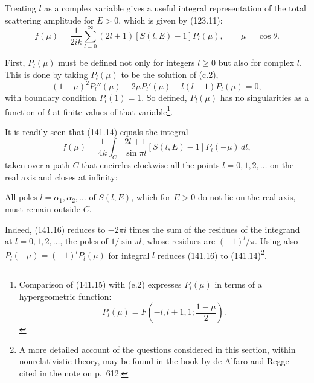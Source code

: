 Treating $l$ as a complex variable gives a useful integral representation of
the total scattering amplitude for $E>0$, which is given by (123.11):
\begin{equation}
 f(\mu)=\frac1{2ik}\sum_{l=0}^{\infty}(2l+1)[S(l,E)-1]P_l(\mu),\qquad\mu=\cos\theta.
 \tag{141.14}
\end{equation}

First, $P_l(\mu)$ must be defined not only for integers $l\ge0$ but also for
complex $l$. This is done by taking $P_l(\mu)$ to be the solution of (c.2),
\begin{equation}
 (1-\mu)^2P_l''(\mu)-2\mu P_l'(\mu)+l(l+1)P_l(\mu)=0,
 \tag{141.15}
\end{equation}
with boundary condition $P_l(1)=1$. So defined, $P_l(\mu)$ has no
singularities as a function of $l$ at finite values of that
variable\footnote{Comparison of (141.15) with (e.2) expresses $P_l(\mu)$ in
terms of a hypergeometric function:
\[
 P_l(\mu)=F\left(-l,l+1,1;\frac{1-\mu}{2}\right).
\]}.

It is readily seen that (141.14) equals the integral
\begin{equation}
 f(\mu)=\frac1{4k}\int_C\frac{2l+1}{\sin\pi l}[S(l,E)-1]P_l(-\mu)\,dl,
 \tag{141.16}
\end{equation}
taken over a path $C$ that encircles clockwise all the points
$l=0,1,2,\ldots$ on the real axis and closes at infinity:

\begin{center}
\end{center}

All poles $l=\alpha_1,\alpha_2,\ldots$ of $S(l,E)$, which for $E>0$ do not
lie on the real axis, must remain outside $C$.

Indeed, (141.16) reduces to $-2\pi i$ times the sum of the residues of the
integrand at $l=0,1,2,\ldots$, the poles of $1/\sin\pi l$, whose residues are
$(-1)^l/\pi$. Using also $P_l(-\mu)=(-1)^lP_l(\mu)$ for integral $l$ reduces
(141.16) to (141.14)\footnote{A more detailed account of the questions
considered in this section, within nonrelativistic theory, may be found in the
book by de Alfaro and Regge cited in the note on p.~612.}.

